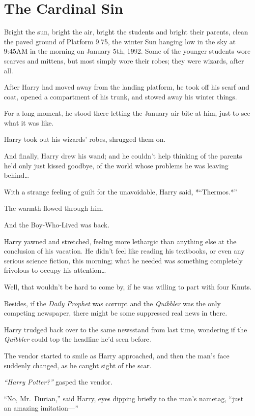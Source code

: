 \chapter{The Cardinal Sin}

Bright the sun, bright the air, bright the students and bright their
parents, clean the paved ground of Platform 9.75, the winter Sun hanging
low in the sky at 9:45AM in the morning on January 5th, 1992. Some of
the younger students wore scarves and mittens, but most simply wore
their robes; they were wizards, after all.

After Harry had moved away from the landing platform, he took off his
scarf and coat, opened a compartment of his trunk, and stowed away his
winter things.

For a long moment, he stood there letting the January air bite at him,
just to see what it was like.

Harry took out his wizards' robes, shrugged them on.

And finally, Harry drew his wand; and he couldn't help thinking of the
parents he'd only just kissed goodbye, of the world whose problems he
was leaving behind\ldots{}

With a strange feeling of guilt for the unavoidable, Harry said,
*``Thermos.*''

The warmth flowed through him.

And the Boy-Who-Lived was back.

Harry yawned and stretched, feeling more lethargic than anything else at
the conclusion of his vacation. He didn't feel like reading his
textbooks, or even any serious science fiction, this morning; what he
needed was something completely frivolous to occupy his
attention\ldots{}

Well, that wouldn't be hard to come by, if he was willing to part with
four Knuts.

Besides, if the \emph{Daily Prophet} was corrupt and the \emph{Quibbler}
was the only competing newspaper, there might be some suppressed real
news in there.

Harry trudged back over to the same newsstand from last time, wondering
if the \emph{Quibbler} could top the headline he'd seen before.

The vendor started to smile as Harry approached, and then the man's face
suddenly changed, as he caught sight of the scar.

\emph{``Harry Potter?''} gasped the vendor.

``No, Mr.~Durian,'' said Harry, eyes dipping briefly to the man's
nametag, ``just an amazing imitation---''

